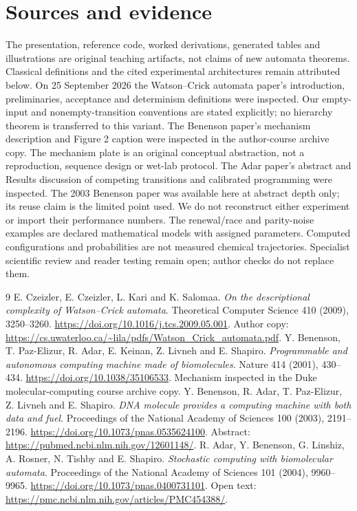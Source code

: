 \section*{Sources and evidence}
The presentation, reference code, worked derivations, generated tables and
illustrations are original teaching artifacts, not claims of new automata
theorems. Classical definitions and the cited experimental architectures
remain attributed below. On 25 September 2026 the Watson--Crick automata
paper's introduction, preliminaries, acceptance and determinism definitions
were inspected. Our empty-input and nonempty-transition conventions are
stated explicitly; no hierarchy theorem is transferred to this variant.
The Benenson paper's mechanism description and Figure 2 caption were inspected
in the author-course archive copy. The mechanism plate is an original
conceptual abstraction, not a reproduction, sequence design or wet-lab protocol.
The Adar paper's abstract and Results discussion of competing transitions
and calibrated programming were inspected. The 2003 Benenson paper was
available here at abstract depth only; its reuse claim is the limited point
used. We do not reconstruct either experiment or import their performance
numbers. The renewal/race and parity-noise examples are declared mathematical
models with assigned parameters. Computed configurations and probabilities
are not measured chemical trajectories. Specialist scientific review and
reader testing remain open; author checks do not replace them.
\begingroup\let\chapter\section
\begin{thebibliography}{9}
 E. Czeizler, E. Czeizler, L. Kari and K. Salomaa.
\emph{On the descriptional complexity of Watson--Crick automata}.
Theoretical Computer Science 410 (2009), 3250--3260.
\url{https://doi.org/10.1016/j.tcs.2009.05.001}.
Author copy: \url{https://cs.uwaterloo.ca/~lila/pdfs/Watson_Crick_automata.pdf}.
 Y. Benenson, T. Paz-Elizur, R. Adar, E. Keinan,
Z. Livneh and E. Shapiro.
\emph{Programmable and autonomous computing machine made of biomolecules}.
Nature 414 (2001), 430--434.
\url{https://doi.org/10.1038/35106533}.
Mechanism inspected in the Duke molecular-computing course archive copy.
 Y. Benenson, R. Adar, T. Paz-Elizur, Z. Livneh and E. Shapiro.
\emph{DNA molecule provides a computing machine with both data and fuel}.
Proceedings of the National Academy of Sciences 100 (2003), 2191--2196.
\url{https://doi.org/10.1073/pnas.0535624100}.
Abstract: \url{https://pubmed.ncbi.nlm.nih.gov/12601148/}.
 R. Adar, Y. Benenson, G. Linshiz, A. Rosner,
N. Tishby and E. Shapiro.
\emph{Stochastic computing with biomolecular automata}.
Proceedings of the National Academy of Sciences 101 (2004), 9960--9965.
\url{https://doi.org/10.1073/pnas.0400731101}.
Open text: \url{https://pmc.ncbi.nlm.nih.gov/articles/PMC454388/}.
\end{thebibliography}\endgroup
